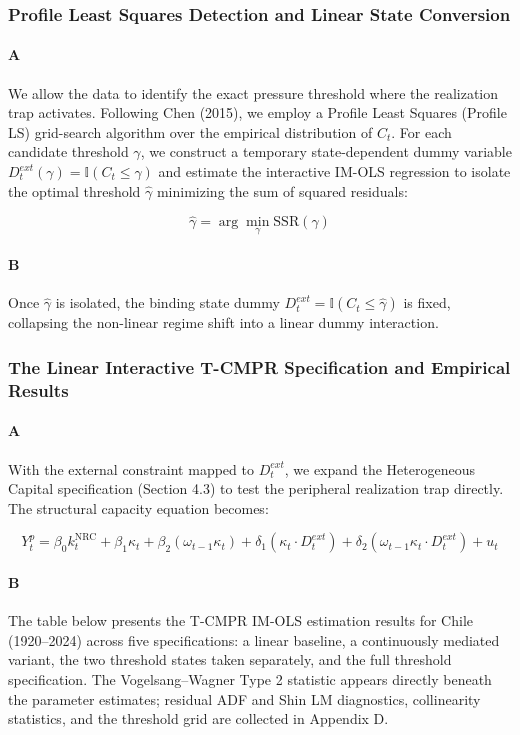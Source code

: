 \subsubsection{Profile Least Squares Detection and Linear State Conversion}

\paragraph{A}
We allow the data to identify the exact pressure threshold where the realization trap activates. Following Chen (2015), we employ a Profile Least Squares (Profile LS) grid-search algorithm over the empirical distribution of $C_t$. For each candidate threshold $\gamma$, we construct a temporary state-dependent dummy variable $D^{ext}_t(\gamma) = \mathbb{I}(C_t \le \gamma)$ and estimate the interactive IM-OLS regression to isolate the optimal threshold $\hat{\gamma}$ minimizing the sum of squared residuals:

\[ \hat{\gamma} = \arg \min_{\gamma} \text{SSR}(\gamma) \]

\paragraph{B}
Once $\hat{\gamma}$ is isolated, the binding state dummy $D^{ext}_t = \mathbb{I}(C_t \le \hat{\gamma})$ is fixed, collapsing the non-linear regime shift into a linear dummy interaction.

\subsubsection{The Linear Interactive T-CMPR Specification and Empirical Results}

\paragraph{A}
With the external constraint mapped to $D^{ext}_t$, we expand the Heterogeneous Capital specification (Section 4.3) to test the peripheral realization trap directly. The structural capacity equation becomes:

\[ Y^p_t = \beta_0 k^{\text{NRC}}_t + \beta_1 \kappa_t + \beta_2 (\omega_{t-1} \kappa_t) + \delta_1 (\kappa_t \cdot D^{ext}_t) + \delta_2 (\omega_{t-1} \kappa_t \cdot D^{ext}_t) + u_t \]

\paragraph{B}
The table below presents the T-CMPR IM-OLS estimation results for Chile (1920–2024) across five specifications: a linear baseline, a continuously mediated variant, the two threshold states taken separately, and the full threshold specification. The Vogelsang--Wagner Type 2 statistic appears directly beneath the parameter estimates; residual ADF and Shin LM diagnostics, collinearity statistics, and the threshold grid are collected in Appendix D.

